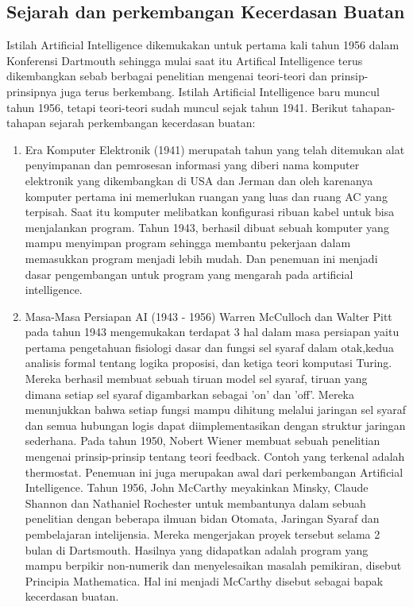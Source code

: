 \begin{enumerate}
\subsection{Sejarah dan perkembangan Kecerdasan Buatan}
Istilah Artificial Intelligence dikemukakan untuk pertama kali tahun 1956 dalam Konferensi Dartmouth sehingga mulai saat itu Artifical Intelligence terus dikembangkan sebab berbagai penelitian mengenai teori-teori dan prinsip-prinsipnya juga terus berkembang. Istilah Artificial Intelligence baru muncul tahun 1956, tetapi teori-teori sudah muncul sejak tahun 1941. 
\hfill\break
\noindent
Berikut tahapan-tahapan sejarah perkembangan kecerdasan buatan:
\begin{enumerate}
\item Era Komputer Elektronik (1941)
\hfill{} merupatah tahun yang telah ditemukan alat penyimpanan dan pemrosesan informasi yang diberi nama komputer elektronik yang dikembangkan di USA dan Jerman dan oleh karenanya komputer pertama ini memerlukan ruangan yang luas dan ruang AC yang terpisah. Saat itu komputer melibatkan konfigurasi ribuan kabel untuk bisa menjalankan program. Tahun 1943, berhasil dibuat sebuah komputer yang mampu menyimpan program sehingga membantu pekerjaan dalam memasukkan program menjadi lebih mudah. Dan penemuan ini menjadi dasar pengembangan untuk program yang mengarah pada artificial intelligence.
\item Masa-Masa Persiapan AI (1943 - 1956) 
\hfill\break
Warren McCulloch dan Walter Pitt pada tahun 1943 mengemukakan terdapat 3 hal dalam masa persiapan yaitu pertama pengetahuan fisiologi dasar dan fungsi sel syaraf dalam otak,kedua analisis formal tentang logika proposisi, dan ketiga teori komputasi Turing. Mereka berhasil membuat sebuah tiruan model sel syaraf, tiruan yang dimana setiap sel syaraf digambarkan sebagai 'on' dan 'off'. Mereka menunjukkan bahwa setiap fungsi mampu dihitung melalui jaringan sel syaraf dan semua hubungan logis dapat diimplementasikan dengan struktur jaringan sederhana.
\hfill\break
Pada tahun 1950, Nobert Wiener membuat sebuah penelitian mengenai prinsip-prinsip tentang teori feedback. Contoh yang terkenal adalah thermostat. Penemuan ini juga merupakan awal dari perkembangan Artificial Intelligence. 
\hfill\break
Tahun 1956, John McCarthy meyakinkan Minsky, Claude Shannon dan Nathaniel Rochester untuk membantunya dalam sebuah penelitian dengan beberapa ilmuan bidan Otomata, Jaringan Syaraf dan pembelajaran intelijensia. Mereka mengerjakan proyek tersebut selama 2 bulan di Dartsmouth. Hasilnya yang didapatkan adalah program yang mampu berpikir non-numerik dan menyelesaikan masalah pemikiran, disebut Principia Mathematica. Hal ini menjadi McCarthy disebut sebagai bapak kecerdasan buatan.

\end{enumerate}
\end{enumerate}
